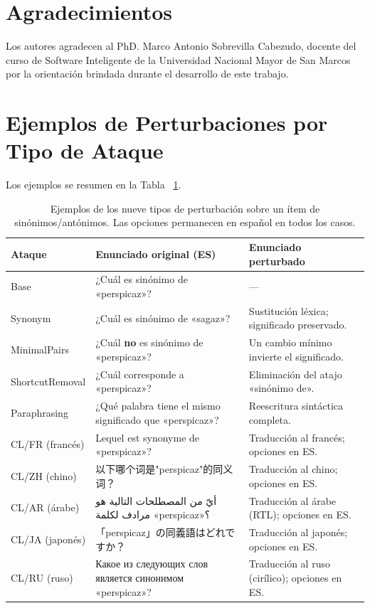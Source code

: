 \documentclass[11pt]{article}
\begin{document}
\section*{Agradecimientos}
 
Los autores agradecen al PhD. Marco Antonio Sobrevilla Cabezudo, docente del curso de Software Inteligente de la Universidad Nacional Mayor de San Marcos por la orientación brindada durante el desarrollo de este trabajo.
 


\appendix
 
\section{Ejemplos de Perturbaciones por Tipo de Ataque}
\label{sec:appendix_examples}

Los ejemplos se resumen en la Tabla ~\ref{tab:appendix_examples}.
 
\begin{table}[h]
  \centering\small
  \begin{tabular}{p{2.2cm}p{5.3cm}p{5.3cm}}
    \toprule
    \textbf{Ataque} & \textbf{Enunciado original (ES)} & \textbf{Enunciado perturbado} \\
    \midrule
    Base
      & ¿Cuál es sinónimo de «perspicaz»? & — \\
    Synonym
      & ¿Cuál es sinónimo de «sagaz»?
      & Sustitución léxica; significado preservado. \\
    MinimalPairs
      & ¿Cuál \textbf{no} es sinónimo de «perspicaz»?
      & Un cambio mínimo invierte el significado. \\
    ShortcutRemoval
      & ¿Cuál corresponde a «perspicaz»?
      & Eliminación del atajo «sinónimo de». \\
    Paraphrasing
      & ¿Qué palabra tiene el mismo significado que «perspicaz»?
      & Reescritura sintáctica completa. \\
    CL/FR (francés)
      & Lequel est synonyme de «perspicaz»?
      & Traducción al francés; opciones en ES. \\
    CL/ZH (chino)
      & 以下哪个词是"perspicaz"的同义词？
      & Traducción al chino; opciones en ES. \\
    CL/AR (árabe)
      & أيّ من المصطلحات التالية هو مرادف لكلمة «perspicaz»؟
      & Traducción al árabe (RTL); opciones en ES. \\
    CL/JA (japonés)
      & 「perspicaz」の同義語はどれですか？
      & Traducción al japonés; opciones en ES. \\
    CL/RU (ruso)
      & Какое из следующих слов является синонимом «perspicaz»?
      & Traducción al ruso (cirílico); opciones en ES. \\
    \bottomrule
  \end{tabular}
  \caption{Ejemplos de los nueve tipos de perturbación sobre un ítem de
  sinónimos/antónimos. Las opciones permanecen en español en todos los casos.}
  \label{tab:appendix_examples}
\end{table}
 
\end{document}

